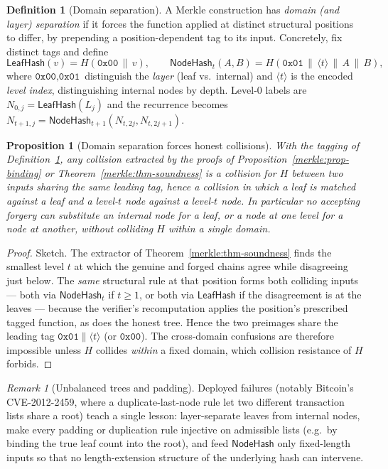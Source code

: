 \documentclass[11pt,a4paper]{article}
\newtheorem{proposition}[theorem]{Proposition}
\theoremstyle{definition}
\newtheorem{definition}[theorem]{Definition}
\theoremstyle{remark}
\newtheorem{remark}[theorem]{Remark}
\begin{document}
\begin{definition}[Domain separation]\label{merkle:def-domain}
A Merkle construction has \emph{domain (and layer) separation} if it forces the function applied at distinct structural positions to differ, by prepending a position-dependent tag to its input. Concretely, fix distinct tags and define
\[
\mathsf{LeafHash}(v) = H(\texttt{0x00} \,\|\, v),
\qquad
\mathsf{NodeHash}_t(A, B) = H(\texttt{0x01} \,\|\, \langle t\rangle \,\|\, A \,\|\, B),
\]
where \(\texttt{0x00}, \texttt{0x01}\) distinguish the \emph{layer} (leaf vs.\ internal) and \(\langle t\rangle\) is the encoded \emph{level index}, distinguishing internal nodes by depth. Level-\(0\) labels are \(N_{0,j} = \mathsf{LeafHash}(L_j)\) and the recurrence becomes \(N_{t+1,j} = \mathsf{NodeHash}_{t+1}(N_{t,2j}, N_{t,2j+1})\).
\end{definition}

\begin{proposition}[Domain separation forces honest collisions]\label{merkle:prop-domain}
With the tagging of Definition~\ref{merkle:def-domain}, any collision extracted by the proofs of Proposition~\ref{merkle:prop-binding} or Theorem~\ref{merkle:thm-soundness} is a collision for \(H\) between two inputs sharing the same leading tag, hence a collision in which a leaf is matched against a leaf and a level-\(t\) node against a level-\(t\) node. In particular no accepting forgery can substitute an internal node for a leaf, or a node at one level for a node at another, without colliding \(H\) within a single domain.
\end{proposition}

\begin{proof}
Sketch. The extractor of Theorem~\ref{merkle:thm-soundness} finds the smallest level \(t\) at which the genuine and forged chains agree while disagreeing just below. The \emph{same} structural rule at that position forms both colliding inputs --- both via \(\mathsf{NodeHash}_t\) if \(t \ge 1\), or both via \(\mathsf{LeafHash}\) if the disagreement is at the leaves --- because the verifier's recomputation applies the position's prescribed tagged function, as does the honest tree. Hence the two preimages share the leading tag \(\texttt{0x01}\|\langle t\rangle\) (or \(\texttt{0x00}\)). The cross-domain confusions are therefore impossible unless \(H\) collides \emph{within} a fixed domain, which collision resistance of \(H\) forbids.
\end{proof}

\begin{remark}[Unbalanced trees and padding]\label{merkle:rem-unbalanced}
Deployed failures (notably Bitcoin's CVE-2012-2459, where a duplicate-last-node rule let two different transaction lists share a root) teach a single lesson: layer-separate leaves from internal nodes, make every padding or duplication rule injective on admissible lists (e.g.\ by binding the true leaf count into the root), and feed \(\mathsf{NodeHash}\) only fixed-length inputs so that no length-extension structure of the underlying hash can intervene.
\end{remark}
\end{document}
